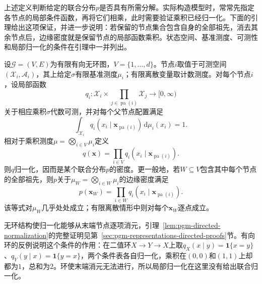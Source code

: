 上述定义判断给定的联合分布$p$是否具有所需分解。实际构造模型时，常常先指定各节点的局部条件函数，再将它们相乘，此时需要验证乘积已经归一化。下面的引理给出这项保证，并进一步说明：若保留的节点集合包含自身的全部祖先，消去其余节点后，边缘密度就是保留节点的局部函数乘积。状态空间、基准测度、可测性和局部归一化的条件在引理中一并列出。

\begin{lemma}[局部归一化与祖先边缘化]
  \label{lem:pgm-directed-normalization}
  设$\mathcal{G}=(V,E)$为有限有向无环图，$V=\{1,\ldots,d\}$。节点$i$取值于可测空间$(\mathcal{X}_i,\mathcal{A}_i)$，其上给定$\sigma$有限基准测度$\mu_i$；有限离散变量取计数测度。对每个节点$i$，设局部函数
  \[
    q_i:
    \mathcal{X}_i\times
    \prod_{j\in\operatorname{pa}(i)}\mathcal{X}_j
    \longrightarrow[0,\infty)
  \]
  关于相应乘积$\sigma$代数可测，并对每个父节点配置满足
  \[
    \int_{\mathcal{X}_i}
    q_i(x_i\mid\bm{x}_{\operatorname{pa}(i)})\,\mathrm{d}\mu_i(x_i)=1.
  \]
  相对于乘积测度$\mu=\bigotimes_{i\in V}\mu_i$定义
  \[
    q(\bm{x})=\prod_{i\in V}
    q_i(x_i\mid\bm{x}_{\operatorname{pa}(i)}).
  \]
  则$q$归一化，因而是某个联合分布$p$的密度。更一般地，若$W\subseteq V$包含其中每个节点的全部祖先，则$p$关于$\mu_W=\bigotimes_{i\in W}\mu_i$的边缘密度满足
  \begin{equation}
    p(\bm{x}_W)=
    \prod_{i\in W}q_i(x_i\mid\bm{x}_{\operatorname{pa}(i)}).
    \label{eq:pgm-directed-ancestral-marginal}
  \end{equation}
  该等式对$\mu_W$几乎处处成立；有限离散情形中则对每个$\bm{x}_W$逐点成立。
\end{lemma}

无环结构使归一化能够从末端节点逐项消元，引理~\ref{lem:pgm-directed-normalization}的完整证明见第~\ref{sec:pgm-representations-directed-proofs}节。有向环的反例说明这个条件的作用：在二值环$X\to Y\to X$上取$q_X(x\mid y)=\mathbf{1}\{x=y\}$、$q_Y(y\mid x)=\mathbf{1}\{y=x\}$，两个条件表各自归一化，乘积在$(0,0)$和$(1,1)$上却都为$1$，总和为$2$。环使末端消元无法进行，所以局部归一化在这里没有给出联合归一化。

